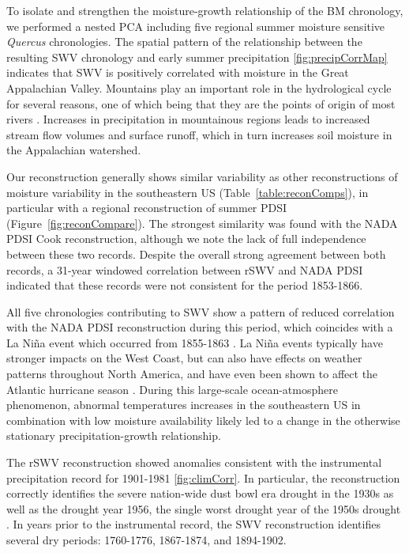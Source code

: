To isolate and strengthen the moisture-growth relationship of the BM
chronology, we performed a nested PCA including five regional summer
moisture sensitive \textit{Quercus} chronologies. The spatial pattern of
the relationship between the resulting SWV chronology and early summer
precipitation \ref{fig:precipCorrMap} indicates that SWV is positively
correlated with moisture in the Great Appalachian Valley. Mountains
play an important role in the hydrological cycle for several reasons,
one of which being that they are the points of origin of most rivers
\cite{beniston1997climatic}. Increases in precipitation in mountainous
regions leads to increased stream flow volumes and surface runoff,
which in turn increases soil moisture in the Appalachian watershed.

Our reconstruction generally shows similar variability as other
reconstructions of moisture variability in the southeastern US
(Table~\ref{table:reconComps}), in particular with a regional
reconstruction of summer PDSI (Figure~\ref{fig:reconCompare}). The
strongest similarity was found with the NADA PDSI Cook reconstruction,
although we note the lack of full independence between these two
records. Despite the overall strong agreement between both records,
a 31-year windowed correlation between rSWV and NADA PDSI indicated that
these records were not consistent for the period 1853-1866.

All five chronologies contributing to SWV show a pattern of reduced
correlation with the NADA PDSI reconstruction during this period,
which coincides with a La Ni\~{n}a event which occurred from
1855-1863 \cite{cole2002multiyear}. La Ni\~{n}a events typically have
stronger impacts on the West Coast, but can also have effects on weather
patterns throughout North America, and have even been shown to affect the
Atlantic hurricane season \cite{pielke1999nina}. During this large-scale
ocean-atmosphere phenomenon, abnormal temperatures increases in the
southeastern US in combination with low moisture availability likely led
to a change in the otherwise stationary precipitation-growth relationship.

The rSWV reconstruction showed anomalies consistent with the instrumental
precipitation record for 1901-1981 \ref{fig:climCorr}. In particular,
the reconstruction correctly identifies the severe nation-wide dust bowl
era drought in the 1930s as well as the drought year 1956, the single
worst drought year of the 1950s drought \cite{fye2003paleoclimatic}. In
years prior to the instrumental record, the SWV reconstruction identifies
several dry periods: 1760-1776, 1867-1874, and 1894-1902.


